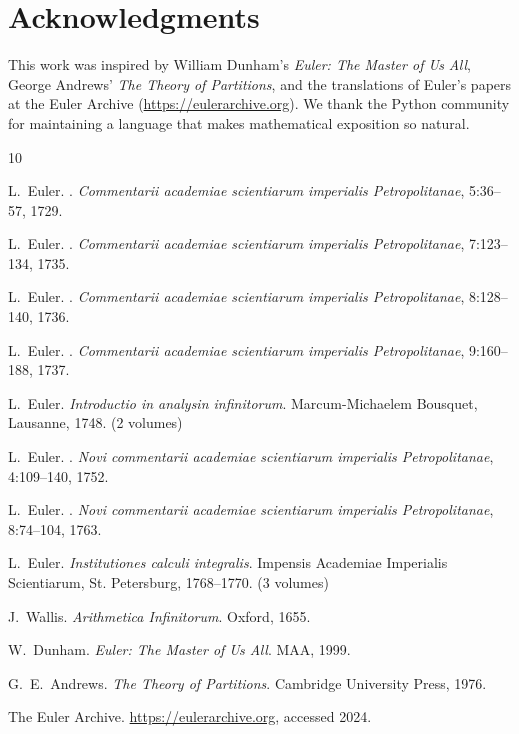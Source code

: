 \documentclass[11pt,a4paper]{article}
\theoremstyle{definition}
\begin{document}
\section*{Acknowledgments}
This work was inspired by William Dunham's \emph{Euler: The Master of Us All}, George Andrews' \emph{The Theory of Partitions}, and the translations of Euler's papers at the Euler Archive (\url{https://eulerarchive.org}). We thank the Python community for maintaining a language that makes mathematical exposition so natural.


\begin{thebibliography}{10}

L.~Euler.
.
\newblock \emph{Commentarii academiae scientiarum imperialis Petropolitanae}, 5:36--57, 1729.

L.~Euler.
.
\newblock \emph{Commentarii academiae scientiarum imperialis Petropolitanae}, 7:123--134, 1735.

L.~Euler.
.
\newblock \emph{Commentarii academiae scientiarum imperialis Petropolitanae}, 8:128--140, 1736.

L.~Euler.
.
\newblock \emph{Commentarii academiae scientiarum imperialis Petropolitanae}, 9:160--188, 1737.

L.~Euler.
\newblock \emph{Introductio in analysin infinitorum}.
\newblock Marcum-Michaelem Bousquet, Lausanne, 1748. (2 volumes)

L.~Euler.
.
\newblock \emph{Novi commentarii academiae scientiarum imperialis Petropolitanae}, 4:109--140, 1752.

L.~Euler.
.
\newblock \emph{Novi commentarii academiae scientiarum imperialis Petropolitanae}, 8:74--104, 1763.

L.~Euler.
\newblock \emph{Institutiones calculi integralis}.
\newblock Impensis Academiae Imperialis Scientiarum, St. Petersburg, 1768--1770. (3 volumes)

J.~Wallis.
\newblock \emph{Arithmetica Infinitorum}.
\newblock Oxford, 1655.

W.~Dunham.
\newblock \emph{Euler: The Master of Us All}.
\newblock MAA, 1999.

G.~E.~Andrews.
\newblock \emph{The Theory of Partitions}.
\newblock Cambridge University Press, 1976.

The Euler Archive.
\newblock \url{https://eulerarchive.org}, accessed 2024.

\end{thebibliography}
\end{document}
